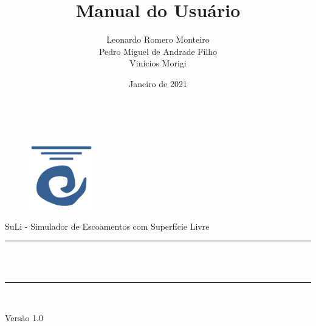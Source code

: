 \documentclass[12pt, a4paper]{article}
\title{Manual do Usuário}
\author{
  Leonardo Romero Monteiro \\[.5 cm]
  Pedro Miguel de Andrade Filho \\[.5 cm]
  Vinícios Morigi
}
\date{Janeiro de 2021}
\makeatletter
\let\thetitle\@title
\let\theauthor\@author
\let\thedate\@date
\makeatother
\begin{document}
\begin{titlepage}
$ $

\vspace{3cm}
\begin{center}

\begin{figure}[htp]
\centering
\includegraphics[width=0.25\textwidth]{suli}
\end{figure}

\vspace{1cm}


{\LARGE SuLi - Simulador de Escoamentos com Superfície Livre}

	\noindent\rule{\linewidth}{0.2 mm} \\[1 cm]
	{\LARGE \bfseries \thetitle}\\[.7 cm]
	\rule{\linewidth}{0.2 mm} \\[1 cm]
	

	{ \Large \theauthor}
	\end{center}


\vspace{6cm}

	\begin{flushleft}
	{\Large Versão 1.0 \\  \thedate}
	\end{flushleft}
	
\end{titlepage}


\newpage
\end{document}
